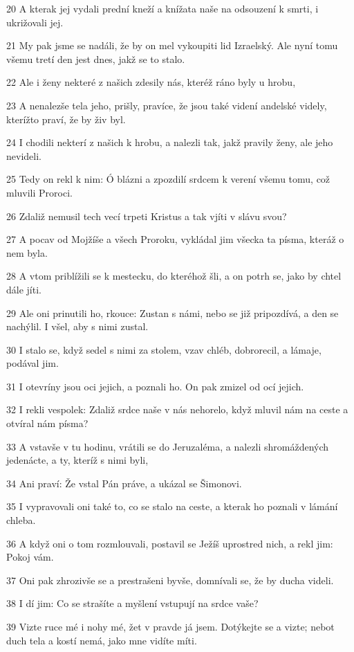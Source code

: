 \par 20 A kterak jej vydali prední kneží a knížata naše na odsouzení k smrti, i ukrižovali jej.
\par 21 My pak jsme se nadáli, že by on mel vykoupiti lid Izraelský. Ale nyní tomu všemu tretí den jest dnes, jakž se to stalo.
\par 22 Ale i ženy nekteré z našich zdesily nás, kteréž ráno byly u hrobu,
\par 23 A nenalezše tela jeho, prišly, pravíce, že jsou také videní andelské videly, kterížto praví, že by živ byl.
\par 24 I chodili nekterí z našich k hrobu, a nalezli tak, jakž pravily ženy, ale jeho nevideli.
\par 25 Tedy on rekl k nim: Ó blázni a zpozdilí srdcem k verení všemu tomu, což mluvili Proroci.
\par 26 Zdaliž nemusil tech vecí trpeti Kristus a tak vjíti v slávu svou?
\par 27 A pocav od Mojžíše a všech Proroku, vykládal jim všecka ta písma, kteráž o nem byla.
\par 28 A vtom priblížili se k mestecku, do kteréhož šli, a on potrh se, jako by chtel dále jíti.
\par 29 Ale oni prinutili ho, rkouce: Zustan s námi, nebo se již pripozdívá, a den se nachýlil. I všel, aby s nimi zustal.
\par 30 I stalo se, když sedel s nimi za stolem, vzav chléb, dobrorecil, a lámaje, podával jim.
\par 31 I otevríny jsou oci jejich, a poznali ho. On pak zmizel od ocí jejich.
\par 32 I rekli vespolek: Zdaliž srdce naše v nás nehorelo, když mluvil nám na ceste a otvíral nám písma?
\par 33 A vstavše v tu hodinu, vrátili se do Jeruzaléma, a nalezli shromáždených jedenácte, a ty, kteríž s nimi byli,
\par 34 Ani praví: Že vstal Pán práve, a ukázal se Šimonovi.
\par 35 I vypravovali oni také to, co se stalo na ceste, a kterak ho poznali v lámání chleba.
\par 36 A když oni o tom rozmlouvali, postavil se Ježíš uprostred nich, a rekl jim: Pokoj vám.
\par 37 Oni pak zhrozivše se a prestrašeni byvše, domnívali se, že by ducha videli.
\par 38 I dí jim: Co se strašíte a myšlení vstupují na srdce vaše?
\par 39 Vizte ruce mé i nohy mé, žet v pravde já jsem. Dotýkejte se a vizte; nebot duch tela a kostí nemá, jako mne vidíte míti.
